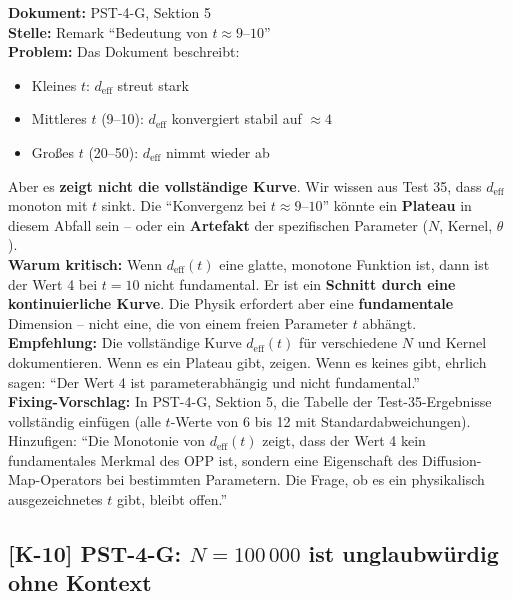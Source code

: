 \documentclass[11pt,a4paper]{article}
\newcommand{\K}[1]{\textbf{[K-#1]}}
\newcommand{\Dok}[1]{\textbf{Dokument:} #1\\}
\newcommand{\Stelle}[1]{\textbf{Stelle:} #1\\}
\newcommand{\Prob}[1]{\textbf{Problem:} #1\\}
\newcommand{\Krit}[1]{\textbf{Warum kritisch:} #1\\}
\newcommand{\Empf}[1]{\textbf{Empfehlung:} #1\\}
\newcommand{\Fix}[1]{\textbf{Fixing-Vorschlag:} #1\\}
\begin{document}
\Dok{PST-4-G, Sektion 5}
\Stelle{Remark ``Bedeutung von $t \approx 9$--$10$''}
\Prob{Das Dokument beschreibt:
\begin{itemize}
  \item Kleines $t$: $d_{\text{eff}}$ streut stark
  \item Mittleres $t$ (9--10): $d_{\text{eff}}$ konvergiert stabil auf $\approx 4$
  \item Gro\ss{}es $t$ (20--50): $d_{\text{eff}}$ nimmt wieder ab
\end{itemize}
Aber es \textbf{zeigt nicht die vollst\"{a}ndige Kurve}. Wir wissen aus
Test 35, dass $d_{\text{eff}}$ monoton mit $t$ sinkt. Die
``Konvergenz bei $t \approx 9$--$10$'' k\"{o}nnte ein \textbf{Plateau}
in diesem Abfall sein -- oder ein \textbf{Artefakt} der spezifischen
Parameter ($N$, Kernel, $\theta$).}
\Krit{Wenn $d_{\text{eff}}(t)$ eine glatte, monotone Funktion ist,
dann ist der Wert 4 bei $t = 10$ nicht fundamental. Er ist ein
\textbf{Schnitt durch eine kontinuierliche Kurve}. Die Physik erfordert
aber eine \textbf{fundamentale} Dimension -- nicht eine, die von einem
freien Parameter $t$ abh\"{a}ngt.}
\Empf{Die vollst\"{a}ndige Kurve $d_{\text{eff}}(t)$ f\"{u}r
verschiedene $N$ und Kernel dokumentieren. Wenn es ein Plateau gibt,
zeigen. Wenn es keines gibt, ehrlich sagen: ``Der Wert 4 ist
parameterabh\"{a}ngig und nicht fundamental.''}
\Fix{In PST-4-G, Sektion 5, die Tabelle der Test-35-Ergebnisse
vollst\"{a}ndig einf\"{u}gen (alle $t$-Werte von 6 bis 12 mit
Standardabweichungen). Hinzufigen: ``Die Monotonie von
$d_{\text{eff}}(t)$ zeigt, dass der Wert 4 kein fundamentales
Merkmal des OPP ist, sondern eine Eigenschaft des
Diffusion-Map-Operators bei bestimmten Parametern. Die Frage,
ob es ein physikalisch ausgezeichnetes $t$ gibt, bleibt offen.''}

\subsection{\K{10} PST-4-G: $N = 100\,000$ ist unglaubw\"{u}rdig ohne Kontext}
\end{document}
